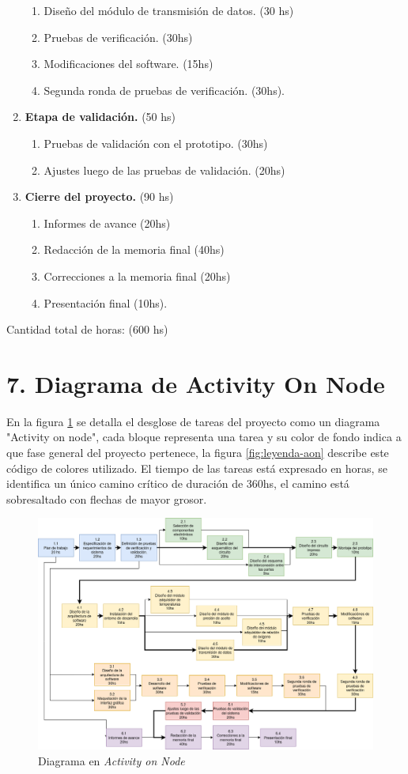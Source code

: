 \documentclass[11pt]{charter}
\begin{document}
\begin{enumerate}
\begin{enumerate}
	\item Diseño del módulo de transmisión de datos. (30 hs)
	\item Pruebas de verificación. (30hs)
	\item Modificaciones del software. (15hs)
	\item Segunda ronda de pruebas de verificación. (30hs).
	\end{enumerate}
\item \textbf{Etapa de validación.} (50 hs)
	\begin{enumerate}
	\item Pruebas de validación con el prototipo. (30hs)
	\item Ajustes luego de las pruebas de validación. (20hs)
	\end{enumerate}
\item \textbf{Cierre del proyecto.} (90 hs)
	\begin{enumerate}
	\item Informes de avance (20hs)
	\item Redacción de la memoria final (40hs)
	\item Correcciones a la memoria final (20hs)
	\item Presentación final (10hs).
	\end{enumerate}
\end{enumerate}

Cantidad total de horas: (600 hs)


\section{7. Diagrama de Activity On Node}
\label{sec:AoN}

En la figura \ref{fig:AoN} se detalla el desglose de tareas del proyecto como un diagrama "Activity on node", cada bloque representa una tarea y su color de fondo indica a que fase general del proyecto pertenece, la figura \ref{fig:leyenda-aon} describe este código de colores utilizado. El tiempo de las tareas está expresado en horas, se identifica un único camino crítico de duración de 360hs, el camino está sobresaltado con flechas de mayor grosor.

\begin{figure}[htpb]
\centering 
\includegraphics[angle=90, width=.9\textwidth]{./Figuras/activity-on-node.png}
\caption{Diagrama en \textit{Activity on Node}}
\label{fig:AoN}
\end{figure}
\end{document}
